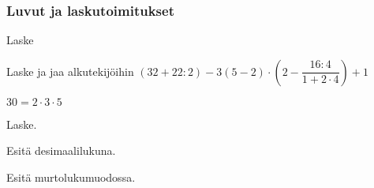 \subsubsection*{Luvut ja laskutoimitukset}

\begin{tehtava}
	Laske
	\begin{vastaus}
	\end{vastaus}
\end{tehtava}

\begin{tehtava}
	Laske ja jaa alkutekijöihin
	$(32+22:2)-3(5-2)\cdot\left(2-\dfrac{16:4}{1+2\cdot4}\right)+1$
\begin{vastaus}
	$30=2\cdot3\cdot5$

\end{vastaus}
\end{tehtava}

\begin{tehtava}
	Laske.

\begin{vastaus}
\end{vastaus}
\end{tehtava}

\begin{tehtava}
	Esitä desimaalilukuna.

\begin{vastaus}
\end{vastaus}
\end{tehtava}

\begin{tehtava}
	Esitä murtolukumuodossa.

\begin{vastaus}
\end{vastaus}
\end{tehtava}

